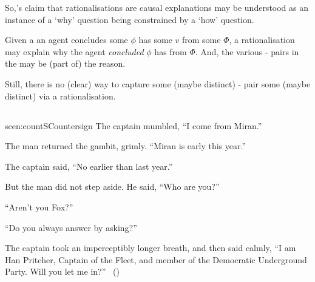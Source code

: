 \documentclass[10pt]{article}
\begin{document}
\begin{note}
  So,\citeauthor{Davidson:1963aa}'s claim that rationalisations are causal explanations may be understood as an instance of a `why' question being constrained by a `how' question.

  Given a \eiw{} an agent concludes some  \(\phi\) has some  \(v\) from some \pool{} \(\Phi\), a rationalisation may explain why the agent \emph{concluded} \(\phi\) has  from \(\Phi\).
  And, the various - pairs in the \pool{} may be (part of) the \agents{} reason.

  Still, there is no (clear) way to capture some (maybe distinct) - pair \fof{} some (maybe distinct) \pool{} via a rationalisation.
\end{note}

\subsection*{}
\label{sec:scen3}

\begin{note}
  \begin{rscenario}{scen:countS}{Countersign}%
    \indent The captain mumbled, ``I come from Miran.''

    The man returned the gambit, grimly.
    ``Miran is early this year.''

    The captain said, ``No earlier than last year.''

    But the man did not step aside.
    He said, ``Who are you?''

    ``Aren't you Fox?''

    ``Do you always answer by asking?''

    The captain took an imperceptibly longer breath, and then said calmly,
    ``I am Han Pritcher, Captain of the Fleet, and member of the Democratic Underground Party.
    Will you let me in?''%
    \mbox{ }\hfill\mbox{(\cite[70]{Asimov:1945aa})}%
    \newline
  \end{rscenario}
\end{note}
\end{document}
